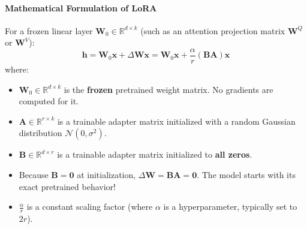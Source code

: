\paragraph{Mathematical Formulation of LoRA}
For a frozen linear layer $\mathbf{W}_0 \in \mathbb{R}^{d \times k}$ (such as an attention projection matrix $\mathbf{W}^Q$ or $\mathbf{W}^V$):
\begin{equation}
\mathbf{h} = \mathbf{W}_0 \mathbf{x} + \Delta \mathbf{W} \mathbf{x} = \mathbf{W}_0 \mathbf{x} + \frac{\alpha}{r} (\mathbf{B} \mathbf{A}) \mathbf{x}\label{eq:lora_eq}
\end{equation}
where:
\begin{itemize}
    \item $\mathbf{W}_0 \in \mathbb{R}^{d \times k}$ is the \textbf{frozen} pretrained weight matrix. No gradients are computed for it.
    \item $\mathbf{A} \in \mathbb{R}^{r \times k}$ is a trainable adapter matrix initialized with a random Gaussian distribution $\mathcal{N}(0, \sigma^2)$.
    \item $\mathbf{B} \in \mathbb{R}^{d \times r}$ is a trainable adapter matrix initialized to \textbf{all zeros}.
    \item Because $\mathbf{B} = \mathbf{0}$ at initialization, $\Delta \mathbf{W} = \mathbf{B}\mathbf{A} = \mathbf{0}$. The model starts with its exact pretrained behavior!
    \item $\frac{\alpha}{r}$ is a constant scaling factor (where $\alpha$ is a hyperparameter, typically set to $2r$).
\end{itemize}

